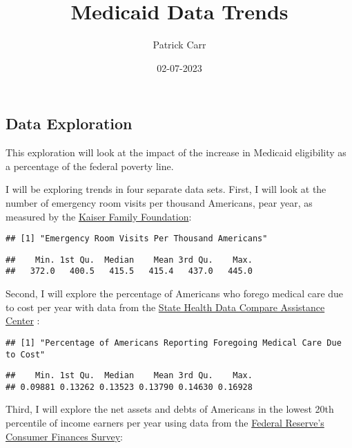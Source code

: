 \documentclass[
]{article}
\title{Medicaid Data Trends}
\author{Patrick Carr}
\date{02-07-2023}
\begin{document}
\maketitle

\hypertarget{data-exploration}{%
\subsection{Data Exploration}\label{data-exploration}}

This exploration will look at the impact of the increase in Medicaid
eligibility as a percentage of the federal poverty line.

I will be exploring trends in four separate data sets. First, I will
look at the number of emergency room visits per thousand Americans, pear
year, as measured by the
\href{https://www.kff.org/other/state-indicator/emergency-room-visits-by-ownership/?activeTab=graph\&currentTimeframe=0\&startTimeframe=16\&selectedDistributions=total\&selectedRows=\%7B\%22wrapups\%22:\%7B\%22united-states\%22:\%7B\%7D\%7D\%7D\&sortModel=\%7B\%22colId\%22:\%22Location\%22,\%22sort\%22:\%22asc\%22\%7D}{Kaiser
Family Foundation}:

\begin{verbatim}
## [1] "Emergency Room Visits Per Thousand Americans"
\end{verbatim}

\begin{verbatim}
##    Min. 1st Qu.  Median    Mean 3rd Qu.    Max. 
##   372.0   400.5   415.5   415.4   437.0   445.0
\end{verbatim}

Second, I will explore the percentage of Americans who forego medical
care due to cost per year with data from the
\href{https://statehealthcompare.shadac.org/landing/178/percent-of-adults-who-could-not-get-medical-care-when-needed-due-to-cost-by-total-2011-to-2021}{State
Health Data Compare Assistance Center} :

\begin{verbatim}
## [1] "Percentage of Americans Reporting Foregoing Medical Care Due to Cost"
\end{verbatim}

\begin{verbatim}
##    Min. 1st Qu.  Median    Mean 3rd Qu.    Max. 
## 0.09881 0.13262 0.13523 0.13790 0.14630 0.16928
\end{verbatim}

Third, I will explore the net assets and debts of Americans in the
lowest 20th percentile of income earners per year using data from the
\href{https://www.federalreserve.gov/econres/scf/dataviz/scf/chart/\#series:Before_Tax_Income;demographic:inccat;population:1;units:median;range:1989,2019}{Federal
Reserve's Consumer Finances Survey}:
\end{document}

